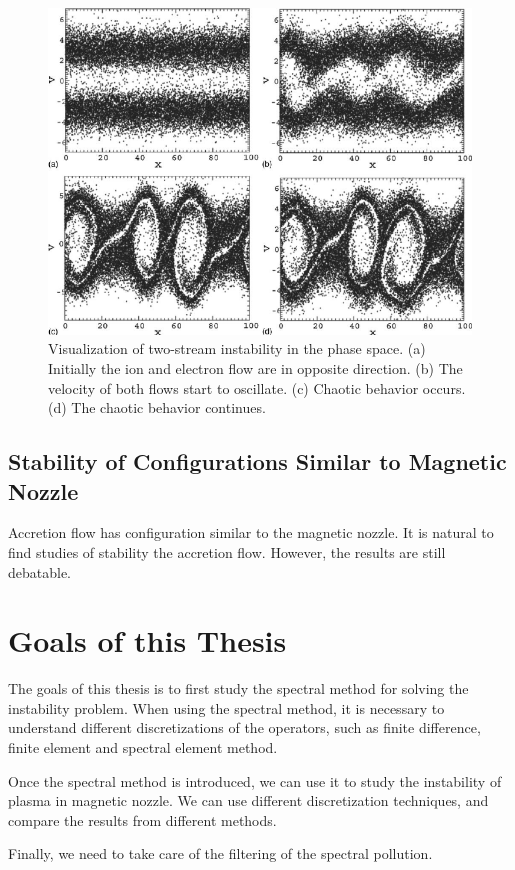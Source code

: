 \begin{figure}[H]
	\centering
	\includegraphics[width=0.7\linewidth]{img/introduction/two_stream_instability}
	\caption{Visualization of two-stream instability in the phase space. (a) Initially the ion and electron flow are in opposite direction. (b) The velocity of both flows start to oscillate. (c) Chaotic behavior occurs. (d) The chaotic behavior continues. \cite{ha_nonlinear_2011}}
	\label{fig:two-stream-instability}
\end{figure}

\subsection{Stability of Configurations Similar to Magnetic Nozzle}
Accretion flow has configuration similar to the magnetic nozzle. It is natural to find studies of stability the accretion flow. However, the results are still debatable. \cite{keto_stability_2020,aikawa_stability_1979,stellingwerf_stability_1978}


\section{Goals of this Thesis}
The goals of this thesis is to first study the spectral method for solving the instability problem. When using the spectral method, it is necessary to understand different discretizations of the operators, such as finite difference, finite element and spectral element method.

Once the spectral method is introduced, we can use it to study the instability of plasma in magnetic nozzle. We can use different discretization techniques, and compare the results from different methods.

Finally, we need to take care of the filtering of the spectral pollution.


